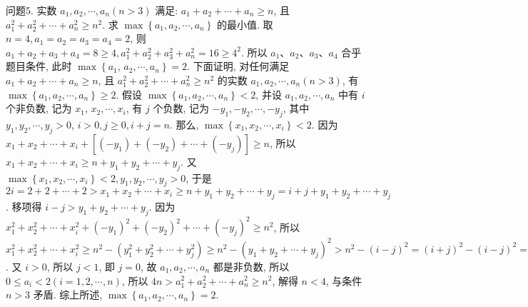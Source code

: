 问题5. 实数 $a_1, a_2, \cdots, a_n(n>3)$ 满足: $a_1+a_2+\cdots+a_n \geqslant n$, 且 $a_1^2+a_2^2+\cdots+ a_n^2 \geqslant n^2$. 求 $\max \left\{a_1, a_2, \cdots, a_n\right\}$ 的最小值.
取 $n=4, a_1=a_2=a_3=a_4=2$, 则 $a_1+a_2+a_3+a_4=8 \geqslant 4, a_1^2+ a_2^2+a_3^2+a_n^2=16 \geqslant 4^2$. 所以 $a_1 、 a_2 、 a_3 、 a_4$ 合乎题目条件, 此时 $\max \left\{a_1\right.$, $\left.a_2, \cdots, a_n\right\}=2$. 下面证明, 对任何满足 $a_1+a_2+\cdots+a_n \geqslant n$, 且 $a_1^2+a_2^2+\cdots+ a_n^2 \geqslant n^2$ 的实数 $a_1, a_2, \cdots, a_n(n>3)$, 有 $\max \left\{a_1, a_2, \cdots, a_n\right\} \geqslant 2$. 假设 $\max \left\{a_1, a_2, \cdots, a_n\right\}<2$, 并设 $a_1, a_2, \cdots, a_n$ 中有 $i$ 个非负数, 记为 $x_1$, $x_2, \cdots, x_i$, 有 $j$ 个负数, 记为 $-y_1,-y_2, \cdots,-y_j$, 其中 $y_1, y_2, \cdots, y_j>0$, $i>0, j \geqslant 0, i+j=n$. 那么, $\max \left\{x_1, x_2, \cdots, x_i\right\}<2$. 因为 $x_1+x_2+\cdots+ x_i+\left[\left(-y_1\right)+\left(-y_2\right)+\cdots+\left(-y_j\right)\right] \geqslant n$, 所以 $x_1+x_2+\cdots+x_i \geqslant n+ y_1+y_2+\cdots+y_j$. 又 $\max \left\{x_1, x_2, \cdots, x_i\right\}<2, y_1, y_2, \cdots, y_j>0$, 于是 $2 i= 2+2+\cdots+2>x_1+x_2+\cdots+x_i \geqslant n+y_1+y_2+\cdots+y_j=i+j+y_1+ y_2+\cdots+y_j$. 移项得 $i-j>y_1+y_2+\cdots+y_j$. 因为 $x_1^2+x_2^2+\cdots+x_i^2+\left(-y_1\right)^2+ \left(-y_2\right)^2+\cdots+\left(-y_j\right)^2 \geqslant n^2$, 所以 $x_1^2+x_2^2+\cdots+x_i^2 \geqslant n^2-\left(y_1^2+y_2^2+\cdots+\right. \left.y_j^2\right) \geqslant n^2-\left(y_1+y_2+\cdots+y_j\right)^2>n^2-(i-j)^2=(i+j)^2-(i-j)^2=4 i j$. 又 $i>0$, 所以 $j<1$, 即 $j=0$, 故 $a_1, a_2, \cdots, a_n$ 都是非负数, 所以 $0 \leqslant a_i< 2(i=1,2, \cdots, n)$, 所以 $4 n>a_1^2+a_2^2+\cdots+a_n^2 \geqslant n^2$, 解得 $n<4$, 与条件 $n>3$ 矛盾.
综上所述, $\max \left\{a_1, a_2, \cdots, a_n\right\}=2$.


